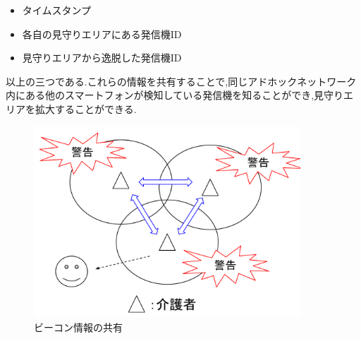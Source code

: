 \begin{itemize}
\item タイムスタンプ
\item 各自の見守りエリアにある発信機ID
\item 見守りエリアから逸脱した発信機ID
\end{itemize}

以上の三つである.これらの情報を共有することで,同じアドホックネットワーク内にある他のスマートフォンが検知している発信機を知ることができ,見守りエリアを拡大することができる.

\begin{figure}[htbp]
\centering
\includegraphics[width=10cm]{fig/share.pdf}
\caption{ビーコン情報の共有}
\end{figure}
